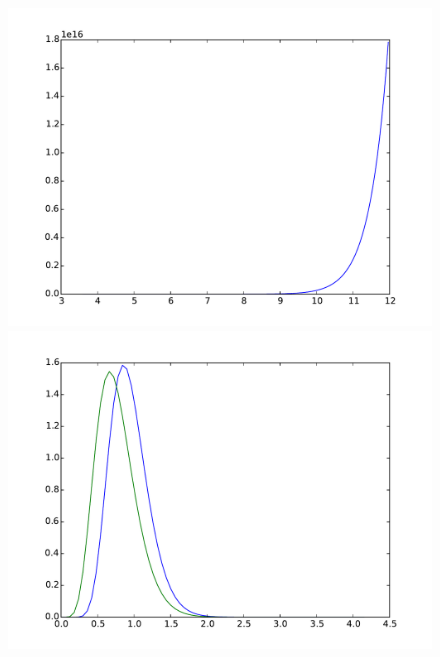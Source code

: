 \documentclass{article}
\begin{document}
\begin{figure}[htb]
\begin{minipage}{.3\textwidth}
	\end{minipage}
	\begin{minipage}{.3\textwidth}
		\centering
		\includegraphics[width=0.97\linewidth]{bootstrap-filter/relative_tail_complex_3_1.pdf}
	\end{minipage}
	\begin{minipage}{.3\textwidth}
		\centering
		\includegraphics[width=0.97\linewidth]{bootstrap-filter/global_complex_4_3.pdf}
	\end{minipage}
	\begin{minipage}{.3\textwidth}
		\centering

\end{minipage}
\end{figure}
\end{document}
